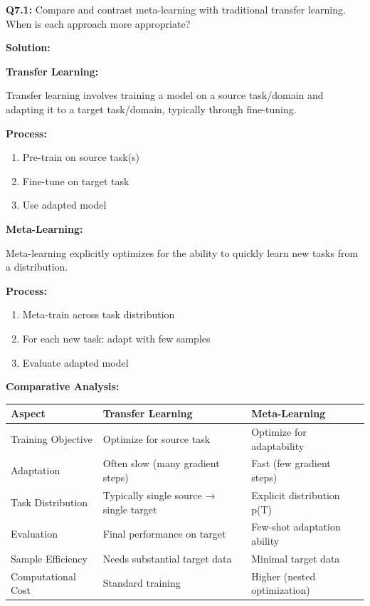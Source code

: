 \documentclass[12pt]{article}
\begin{document}
{{			\textbf{Q7.1:} Compare and contrast meta-learning with traditional transfer learning. When is each approach more appropriate?
			
			\textbf{Solution:}
			
			\textbf{Transfer Learning:}
			
			Transfer learning involves training a model on a source task/domain and adapting it to a target task/domain, typically through fine-tuning.
			
			\textbf{Process:}
			\begin{enumerate}
				\item Pre-train on source task(s)
				\item Fine-tune on target task
				\item Use adapted model
			\end{enumerate}
			
			\textbf{Meta-Learning:}
			
			Meta-learning explicitly optimizes for the ability to quickly learn new tasks from a distribution.
			
			\textbf{Process:}
			\begin{enumerate}
				\item Meta-train across task distribution
				\item For each new task: adapt with few samples
				\item Evaluate adapted model
			\end{enumerate}
			
			\textbf{Comparative Analysis:}
			
			\begin{center}
			\begin{tabular}{|l|l|l|}
			\hline
			\textbf{Aspect} & \textbf{Transfer Learning} & \textbf{Meta-Learning} \\
			\hline
			Training Objective & Optimize for source task & Optimize for adaptability \\
			Adaptation & Often slow (many gradient steps) & Fast (few gradient steps) \\
			Task Distribution & Typically single source → single target & Explicit distribution p(T) \\
			Evaluation & Final performance on target & Few-shot adaptation ability \\
			Sample Efficiency & Needs substantial target data & Minimal target data \\
			Computational Cost & Standard training & Higher (nested optimization) \\
			\hline
			\end{tabular}
			\end{center}
			
}}
\end{document}
